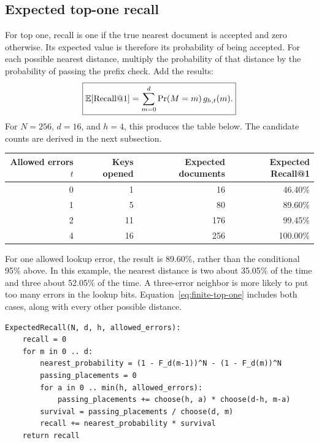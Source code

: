 \subsection{Expected top-one recall}
For top one, recall is one if the true nearest document is accepted and zero otherwise.
Its expected value is therefore its probability of being accepted. For each possible nearest
distance, multiply the probability of that distance by the probability of passing the prefix
check. Add the results:
\begin{equation}
\boxed{\mathbb E[\operatorname{Recall@1}]
=\sum_{m=0}^{d}\Pr(M=m)\,g_{h,t}(m).}
\label{eq:finite-top-one}
\end{equation}
For $N=256$, $d=16$, and $h=4$, this produces the table below. The candidate counts are derived
in the next subsection.

\begin{center}
\begin{tabular}{@{}rrrr@{}}
\toprule
Allowed errors $t$ & Keys opened & Expected documents & Expected Recall@1\\\midrule
0 & 1 & 16 & 46.40\%\\
1 & 5 & 80 & 89.60\%\\
2 & 11 & 176 & 99.45\%\\
4 & 16 & 256 & 100.00\%\\\bottomrule
\end{tabular}
\end{center}
For one allowed lookup error, the result is 89.60\%, rather than the conditional 95\% above.
In this example, the nearest distance is two about 35.05\% of the time and three about
52.05\% of the time. A three-error neighbor is more likely to put too many errors in the
lookup bits. Equation~\eqref{eq:finite-top-one} includes both cases, along with every other
possible distance.

\par\noindent\begin{minipage}{\linewidth}
\begin{lstlisting}[caption={Calculate expected top-one recall under the random-bit assumptions.}]
ExpectedRecall(N, d, h, allowed_errors):
    recall = 0
    for m in 0 .. d:
        nearest_probability = (1 - F_d(m-1))^N - (1 - F_d(m))^N
        passing_placements = 0
        for a in 0 .. min(h, allowed_errors):
            passing_placements += choose(h, a) * choose(d-h, m-a)
        survival = passing_placements / choose(d, m)
        recall += nearest_probability * survival
    return recall
\end{lstlisting}
\end{minipage}\par

